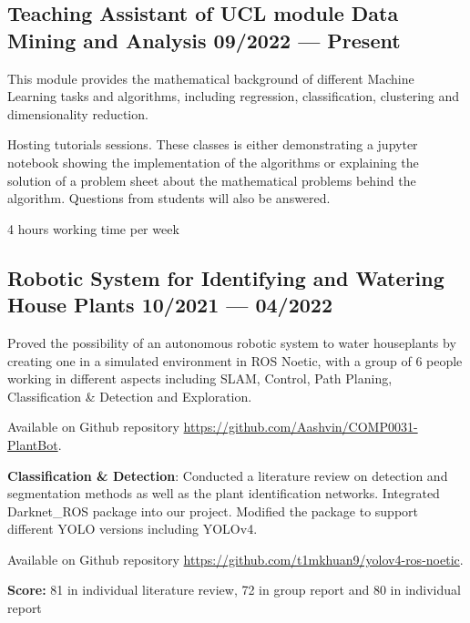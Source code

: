 \subsection{
    Teaching Assistant of UCL module Data Mining and Analysis
    \hfill 09/2022 --- Present
}
    \begin{zitemize}
        \item   This module provides the mathematical background of different Machine 
                Learning tasks and algorithms, including regression, classification, 
                clustering and dimensionality reduction.
        \item   Hosting tutorials sessions. These classes is either demonstrating a jupyter
                notebook showing the implementation of the algorithms or explaining the solution of 
                a problem sheet about the mathematical problems behind the algorithm. Questions 
                from students will also be answered. 
        \item   4 hours working time per week
    \end{zitemize}

\subsection{
    Robotic System for Identifying and Watering House Plants 
    \hfill 10/2021 --- 04/2022
}
    \begin{zitemize}
        \item   Proved the possibility of an autonomous robotic system to water houseplants
                by creating one in a simulated environment in ROS Noetic, 
                with a group of 6 people working in different aspects including
                SLAM, Control, Path Planing, Classification \& Detection and Exploration.
        \item   Available on Github repository
                \url{https://github.com/Aashvin/COMP0031-PlantBot}.
        \item   \textbf{Classification \& Detection}: 
                Conducted a literature review on detection and 
                segmentation methods as well as the plant identification networks.
                Integrated Darknet\_ROS package into our project.
                Modified the package to support different YOLO versions including YOLOv4.
        \item   Available on Github repository
                \url{https://github.com/t1mkhuan9/yolov4-ros-noetic}.
        \item   \textbf{Score:}
                81 in individual literature review, 72 in group report and 80 in individual report
    \end{zitemize}


